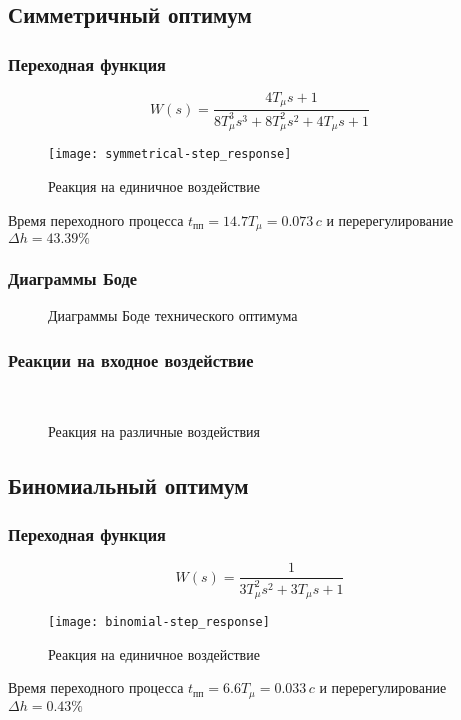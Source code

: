 		\subsection{Симметричный оптимум}
			\subsubsection{Переходная функция}
				$$W(s)=\frac{4T_\mu s+1}{8T_\mu^3 s^3+8T_\mu^2 s^2+4T_\mu s+1}$$
				\begin{figure}[H]
					\centering
					\texttt{[image: symmetrical-step\_response]}
					\caption{Реакция на единичное воздействие}
				\end{figure}
				Время переходного процесса $t_{\text{пп}}=14.7T_{\mu}=0.073\,c$ и перерегулирование $\Delta h=43.39\%$
			\subsubsection{Диаграммы Боде}
				\begin{figure}[H]
					\centering
					\caption{Диаграммы Боде технического оптимума}
				\end{figure}
			\subsubsection{Реакции на входное воздействие}
				\begin{figure}[H]
					\centering
					\\
					\centering{}
					\caption{Реакция на различные воздействия}
				\end{figure}
		\subsection{Биномиальный оптимум}
			\subsubsection{Переходная функция}
				$$W(s)=\frac{1}{3T_\mu^2 s^2+3T_\mu s+1}$$
				\begin{figure}[H]
					\centering
					\texttt{[image: binomial-step\_response]}
					\caption{Реакция на единичное воздействие}
				\end{figure}
				Время переходного процесса $t_{\text{пп}}=6.6T_{\mu}=0.033\,c$ и перерегулирование $\Delta h=0.43\%$
